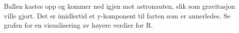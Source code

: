 \subsubsection{}

Ballen kastes opp og kommer ned igjen mot astronauten, slik som gravitasjon ville gjort. Det er imidlertid et y-komponent til farten som er annerledes. Se grafen for en visualisering av høyere verdier for R.

\begin{figure}[H]
\centering

\caption{}
\end{figure}

\newpage




\newpage